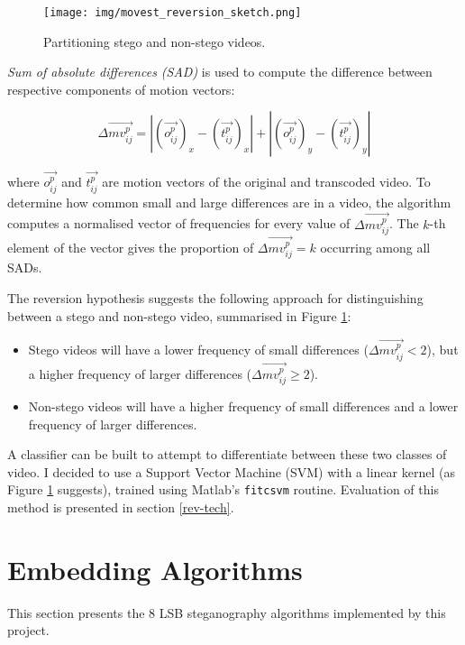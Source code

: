 \documentclass[12pt,british,twoside,notitlepage,usenames,dvipsnames,hypens,final]{report}
\numberwithin{equation}{section}
\numberwithin{figure}{section}
\begin{document}
\begin{figure}
\vspace{-15pt}
\texttt{[image: img/movest\_reversion\_sketch.png]}
\caption{Partitioning stego and non-stego videos.}
\label{fig:movest-reversion-sketch}
\end{figure}

\emph{Sum of absolute differences (SAD)} is used to compute the difference between respective components of motion vectors:

$$ \Delta \overrightarrow{mv^p_{ij}} = |(\overrightarrow{o^p_{ij}})_x - (\overrightarrow{t^p_{ij}})_x| +  |(\overrightarrow{o^p_{ij}})_y - (\overrightarrow{t^p_{ij}})_y|$$

where $\overrightarrow{o^p_{ij}}$ and $\overrightarrow{t^p_{ij}}$ are motion vectors of the original and transcoded video. To determine how common small and large differences are in a video, the algorithm computes a normalised vector of frequencies for every value of $\Delta\overrightarrow{mv^p_{ij}}$. The $k$-th element of the vector gives the proportion of $\Delta\overrightarrow{mv^p_{ij}} = k$ occurring among all SADs.

The reversion hypothesis suggests the following approach for distinguishing between a stego and non-stego video, summarised in Figure \ref{fig:movest-reversion-sketch}:
\begin{itemize}
\item Stego videos will have a lower frequency of small differences ($\Delta\overrightarrow{mv^p_{ij}} < 2$), but a higher frequency of larger differences ($\Delta\overrightarrow{mv^p_{ij}} \geq 2$).
\item Non-stego videos will have a higher frequency of small differences and a lower frequency of larger differences.
\end{itemize}
A classifier can be built to attempt to differentiate between these two classes of video. I decided to use a Support Vector Machine (SVM) with a linear kernel (as Figure \ref{fig:movest-reversion-sketch} suggests), trained using Matlab's \texttt{fitcsvm} routine. Evaluation of this method is presented in section \ref{rev-tech}.

\section{Embedding Algorithms}
\label{emb-alg}

This section presents the 8 LSB steganography algorithms implemented by this project.
\end{document}
